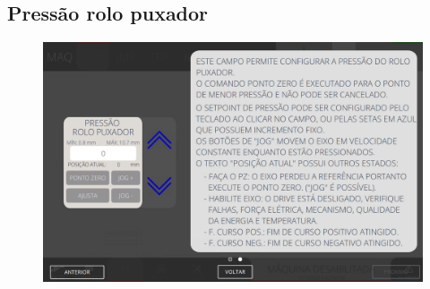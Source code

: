 \newpage
\thispagestyle{fancy}
\vspace{\fill}
\subsection{Pressão rolo puxador}
\begin{figure}
    \centering
    \includegraphics[width=576 px,height=360 px]{src/imagesICV/03-feeder/settings/3.png}
\end{figure}
